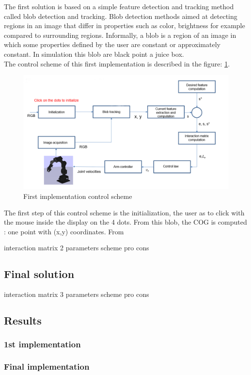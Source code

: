 The first solution is based on a simple feature detection and tracking method called blob detection and tracking. Blob detection methods aimed at detecting regions in an image that differ in properties such as color, brightness for example compared to surrounding regions. Informally, a blob is a region of an image in which some properties defined by the user are constant or approximately constant. In simulation this blob are black point a juice box.\\
The control scheme of this first implementation is described in the figure: \ref{pict:control_scheme_1}.
\begin{figure} [!ht]
    \centering
    \includegraphics[width=1.\linewidth]{images/control_scheme_1.png}
    \caption{First implementation control scheme}
    \label{pict:control_scheme_1}
\end{figure}

The first step of this control scheme is the initialization, the user as to click with the mouse inside the display on the 4 dots. From this blob, the \gls{COG} is computed : one point with (x,y) coordinates. From



interaction matrix 2 parameters
scheme
pro cons

\subsection{Final solution}
interaction matrix 3 parameters
scheme
pro cons

\subsection{Results}

\subsubsection{1st implementation}


\subsubsection{Final implementation}




